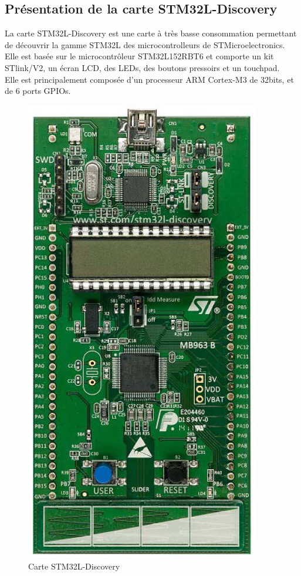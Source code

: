 \documentclass{article}
\begin{document}
	 \subsection{Présentation de la carte STM32L-Discovery}
		La carte STM32L-Discovery est une carte à très basse consommation permettant de découvrir la gamme STM32L 
		des microcontrolleurs de STMicroelectronics. Elle est basée sur le microcontrôleur STM32L152RBT6 et comporte un kit STlink/V2,
		un écran LCD, des LEDs, des boutons pressoirs et un touchpad.\\
		Elle est principalement composée d'un processeur ARM Cortex-M3 de 32bits, et de 6 ports GPIOs.\\
		\begin{figure}[h]
		  \centering
		  \includegraphics[scale=0.3]{img/stm32l_discovery.jpg}
		  \caption{Carte STM32L-Discovery}
		\end{figure}
\end{document}
